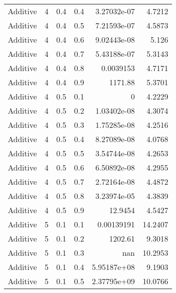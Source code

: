\documentclass{article}
\begin{document}
\begin{longtable}[H]{lrrrrr}
 Additive       &       4 &   0.4 &            0.4 &      3.27032e-07 &          4.7212 \\
 Additive       &       4 &   0.4 &            0.5 &      7.21593e-07 &          4.5873 \\
 Additive       &       4 &   0.4 &            0.6 &      9.02443e-08 &          5.126  \\
 Additive       &       4 &   0.4 &            0.7 &      5.43188e-07 &          5.3143 \\
 Additive       &       4 &   0.4 &            0.8 &      0.0039153   &          4.7171 \\
 Additive       &       4 &   0.4 &            0.9 &   1171.88        &          5.3701 \\
 Additive       &       4 &   0.5 &            0.1 &      0           &          4.2229 \\
 Additive       &       4 &   0.5 &            0.2 &      1.03402e-08 &          4.3074 \\
 Additive       &       4 &   0.5 &            0.3 &      1.75285e-08 &          4.2516 \\
 Additive       &       4 &   0.5 &            0.4 &      8.27089e-08 &          4.0768 \\
 Additive       &       4 &   0.5 &            0.5 &      3.54744e-08 &          4.2653 \\
 Additive       &       4 &   0.5 &            0.6 &      6.50892e-08 &          4.2955 \\
 Additive       &       4 &   0.5 &            0.7 &      2.72164e-08 &          4.4872 \\
 Additive       &       4 &   0.5 &            0.8 &      3.23974e-05 &          4.3839 \\
 Additive       &       4 &   0.5 &            0.9 &     12.9454      &          4.5427 \\
 Additive       &       5 &   0.1 &            0.1 &      0.00139191  &         14.2407 \\
 Additive       &       5 &   0.1 &            0.2 &   1202.61        &          9.3018 \\
 Additive       &       5 &   0.1 &            0.3 &    nan           &         10.2953 \\
 Additive       &       5 &   0.1 &            0.4 &      5.95187e+08 &          9.1903 \\
 Additive       &       5 &   0.1 &            0.5 &      2.37795e+09 &         10.0766 \\

\end{longtable}
\end{document}
